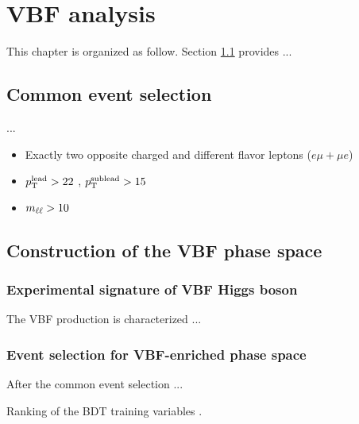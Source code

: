 \chapter{VBF \hwwlnln analysis}\label{section:VBFanalysis}

This chapter is organized as follow. Section \ref{VBF:CommonSelection} provides ...

\section{Common event selection}\label{VBF:CommonSelection}
...

\begin{itemize}
	\item Exactly two opposite charged and different flavor leptons ($e\mu+\mu e$)
	\item $p_{\mathrm{T}}^{\mathrm{lead}} > 22$ \gev, $p_{\mathrm{T}}^{\mathrm{sublead}} > 15$ \gev
	\item $m_{\ell\ell} > 10$ \gev
\end{itemize}




\section{Construction of the VBF  phase space}\label{VBF:VBFSR}

\subsection{Experimental signature of VBF Higgs boson}\label{VBF:Signature}
The VBF production is characterized ... 




\subsection{Event selection for VBF-enriched phase space}\label{VBF:EventSelection}

After the common event selection ...

\begin{table}[!h]
	\centering
	\caption{Ranking of the BDT training variables \cite{ATLASComNote}.}
	\label{tab:ranking}
	\scalebox{0.8}{
		
	}
\end{table}


